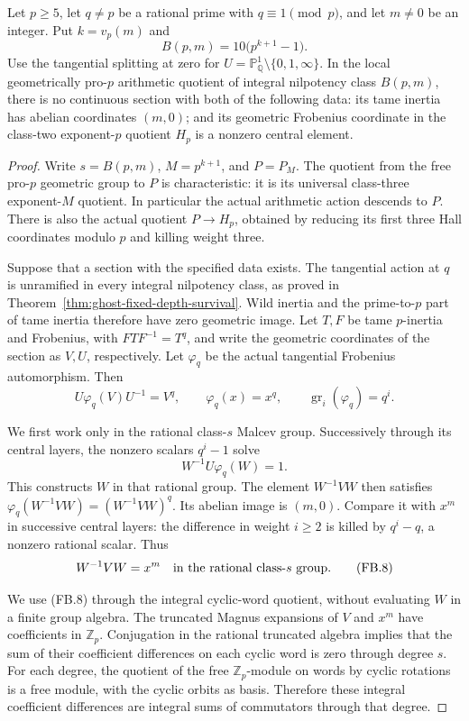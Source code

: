 \begin{proposition}
\label{prop:ghost-finite-local-bound}
Let \(p\ge5\), let \(q\ne p\) be a rational prime with
\(q\equiv1\pmod p\), and let \(m\ne0\) be an integer.
Put \(k=v_p(m)\) and
\[
 B(p,m)=10\bigl(p^{k+1}-1\bigr).
 \tag{FB.5}
\]
Use the tangential splitting at zero for
\(U=\mathbb P^1_{\mathbb Q}\setminus\{0,1,\infty\}\).
In the local geometrically pro-\(p\) arithmetic quotient
of integral nilpotency class \(B(p,m)\), there is no
continuous section with both of the following data:
its tame inertia has abelian coordinates \((m,0)\);
and its geometric Frobenius coordinate in the
class-two exponent-\(p\) quotient \(H_p\) is a
nonzero central element.
\end{proposition}
\begin{proof}
Write \(s=B(p,m)\), \(M=p^{k+1}\), and \(P=P_M\).
The quotient from the free pro-\(p\) geometric group
to \(P\) is characteristic: it is its universal
class-three exponent-\(M\) quotient.
In particular the actual arithmetic action descends
to \(P\). There is also the actual quotient
\(P\to H_p\), obtained by reducing its first three
Hall coordinates modulo \(p\) and killing weight
three.

Suppose that a section with the specified data
exists. The tangential action at \(q\) is unramified
in every integral nilpotency class, as proved in
Theorem~\ref{thm:ghost-fixed-depth-survival}.
Wild inertia and the prime-to-\(p\) part of tame
inertia therefore have zero geometric image.
Let \(T,F\) be tame \(p\)-inertia and Frobenius, with
\(FTF^{-1}=T^q\), and write the geometric coordinates
of the section as \(V,U\), respectively.
Let \(\varphi_q\) be the actual tangential Frobenius
automorphism. Then
\[
 U\varphi_q(V)U^{-1}=V^q,\qquad
 \varphi_q(x)=x^q,\qquad
 \operatorname{gr}_i(\varphi_q)=q^i .
 \tag{FB.6}
\]

We first work only in the rational class-\(s\)
Malcev group. Successively through its central
layers, the nonzero scalars \(q^i-1\) solve
\[
 W^{-1}U\varphi_q(W)=1.
 \tag{FB.7}
\]
This constructs \(W\) in that rational group.
The element \(W^{-1}VW\) then satisfies
\(\varphi_q(W^{-1}VW)=(W^{-1}VW)^q\).
Its abelian image is \((m,0)\).
Compare it with \(x^m\) in successive central
layers: the difference in weight \(i\ge2\) is
killed by \(q^i-q\), a nonzero rational scalar.
Thus
\[
 W^{-1}VW=x^m
 \quad\hbox{in the rational class-\(s\) group}.
 \tag{FB.8}
\]

We use (FB.8) through the integral cyclic-word
quotient, without evaluating \(W\) in a finite
group algebra. The truncated Magnus expansions
of \(V\) and \(x^m\) have coefficients in
\(\mathbb Z_p\). Conjugation in the rational
truncated algebra implies that the sum of their
coefficient differences on each cyclic word is
zero through degree \(s\).
For each degree, the quotient of the free
\(\mathbb Z_p\)-module on words by cyclic rotations
is a free module, with the cyclic orbits as basis.
Therefore these integral coefficient differences
are integral sums of commutators through that
degree.


\end{proof}

